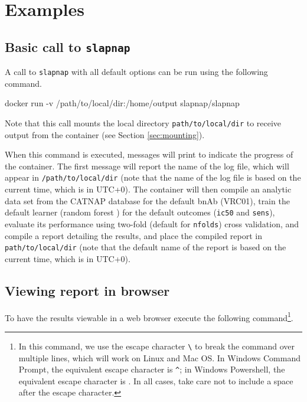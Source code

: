 \documentclass[]{article}
\newenvironment{Shaded}{\begin{snugshade}}{\end{snugshade}}
\newcommand{\ExtensionTok}[1]{#1}
\newcommand{\NormalTok}[1]{#1}
\begin{document}
\section{Examples}\label{sec:examples}

\subsection{\texorpdfstring{Basic call to
\texttt{slapnap}}{Basic call to slapnap}}\label{basic-call-to-slapnap}

A call to \texttt{slapnap} with all default options can be run using the
following command.

\begin{Shaded}
\begin{Highlighting}[]
\ExtensionTok{docker}\NormalTok{ run -v /path/to/local/dir:/home/output slapnap/slapnap}
\end{Highlighting}
\end{Shaded}

Note that this call mounts the local directory
\texttt{path/to/local/dir} to receive output from the container (see
Section \ref{sec:mounting}).

When this command is executed, messages will print to indicate the
progress of the container. The first message will report the name of the
log file, which will appear in \texttt{/path/to/local/dir} (note that
the name of the log file is based on the current time, which is in
UTC+0). The container will then compile an analytic data set from the
CATNAP database for the default bnAb (VRC01), train the default learner
(random forest \citep{breiman2001}) for the default outcomes
(\texttt{ic50} and \texttt{sens}), evaluate its performance using
two-fold (default for \texttt{nfolds}) cross validation, and compile a
report detailing the results, and place the compiled report in
\texttt{path/to/local/dir} (note that the default name of the report is
based on the current time, which is in UTC+0).

\subsection{Viewing report in browser}\label{sec:webbrowse}

To have the results viewable in a web browser execute the following
command\footnote{In this command, we use the escape character
  \texttt{\textbackslash{}} to break the command over multiple lines,
  which will work on Linux and Mac OS. In Windows Command Prompt, the
  equivalent escape character is \texttt{\^{}}; in Windows Powershell,
  the equivalent escape character is \texttt{\textasciigrave{}}. In all
  cases, take care not to include a space after the escape character.}.
\end{document}
